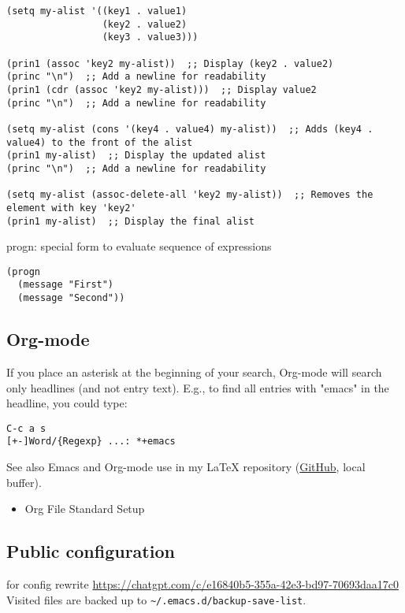 \documentclass{article}
\begin{document}
\begin{verbatim}
(setq my-alist '((key1 . value1)
                 (key2 . value2)
                 (key3 . value3)))

(prin1 (assoc 'key2 my-alist))  ;; Display (key2 . value2)
(princ "\n")  ;; Add a newline for readability
(prin1 (cdr (assoc 'key2 my-alist)))  ;; Display value2
(princ "\n")  ;; Add a newline for readability

(setq my-alist (cons '(key4 . value4) my-alist))  ;; Adds (key4 . value4) to the front of the alist
(prin1 my-alist)  ;; Display the updated alist
(princ "\n")  ;; Add a newline for readability

(setq my-alist (assoc-delete-all 'key2 my-alist))  ;; Removes the element with key 'key2'
(prin1 my-alist)  ;; Display the final alist
\end{verbatim}




progn: special form to evaluate sequence of expressions
\begin{verbatim}
(progn
  (message "First")
  (message "Second"))

\end{verbatim}


\subsection*{Org-mode}
\label{sec:org8637ecd}

If you place an asterisk at the beginning of your search, Org-mode will search only headlines (and not entry text). E.g., to find all entries with "emacs" in the headline, you could type:

\begin{verbatim}
C-c a s
[+-]Word/{Regexp} ...: *+emacs

\end{verbatim}


See also Emacs and Org-mode use in my \LaTeX{} repository (\href{https://github.com/jeszyman/latex}{GitHub}, local buffer). 
\begin{itemize}
\item Org File Standard Setup
\label{sec:org975c78f}
\end{itemize}

\subsection*{Public configuration}
\label{sec:orgaa02ff8}
for config rewrite \url{https://chatgpt.com/c/e16840b5-355a-42e3-bd97-70693daa17c0}
Visited files are backed up to \texttt{\textasciitilde{}/.emacs.d/backup-save-list}. 
\end{document}
